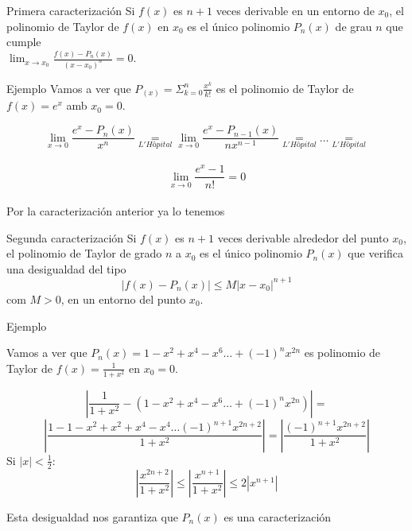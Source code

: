 \begin{frame}{Primera caracterización}
    Si $f(x)$ es $n+1$ veces derivable en un entorno de $x_0$,
    el polinomio de Taylor de $f(x)$ en $x_0$ es el único
    polinomio $P_n(x)$ de grau $n$ que cumple
    \\
    $\lim_{x \rightarrow x_0} \frac{f(x)-P_n(x)}{(x-x_0)^n}=0$.
\end{frame}

\begin{frame}{Ejemplo}
Vamos a ver que $P_(x)= \Sigma^{n}_{k=0} \frac{x^k}{k!}$ es el polinomio
de Taylor de $f(x)=e^x$ amb $x_0=0$.

$$\lim_{x \rightarrow 0} \frac{e^x-P_n(x)}{x^n}\underset{L'Hôpital}{=}
\lim_{x \rightarrow 0} \frac{e^x-P_{n-1}(x)}{nx^{n-1}}\underset{L'Hôpital}{=} \dots \underset{L'Hôpital}{=}$$
\\
$$\lim_{x \rightarrow 0} \frac{e^x-1}{n!}=0$$ 
\\

Por la caracterización anterior ya lo tenemos

    
\end{frame}

\begin{frame}{Segunda caracterización}
    Si $f(x)$ es $n+1$ veces derivable alrededor del punto $x_0$, el polinomio de Taylor de grado $n$ a $x_0$ es el único polinomio $P_n(x)$ que verifica una desigualdad del tipo
    \\
    $$|f(x)-P_n(x)| \leq M|x-x_0|^{n+1}$$
    com $M > 0$, en un entorno del punto $x_0$.
\end{frame}

\begin{frame}{Ejemplo}

    Vamos a ver que $P_n(x)= 1 - x^2 + x^4 - x^6 \dots + (-1)^nx^{2n}$ es polinomio de Taylor de
    $f(x)= \frac{1}{1+x^2}$ en $x_0=0$.

    $$|\frac{1}{1+x^2}-(1 - x^2 + x^4 - x^6 \dots + (-1)^nx^{2n})|
    =$$$$|\frac{1-1-x^2+x^2+x^4-x^4 \dots (-1)^{n+1}x^{2n+2}}{1+x^2}|=|\frac{(-1)^{n+1}x^{2n+2}}{1+x^2}|$$
    Si $|x|< \frac{1}{2}$:
    $$|\frac{x^{2n+2}}{1+x^2}|\leq |\frac{x^{n+1}}{1+x^2}| \leq 2|x^{n+1}| $$

    Esta desigualdad nos garantiza que $P_n(x)$
    es una caracterización
\end{frame}
